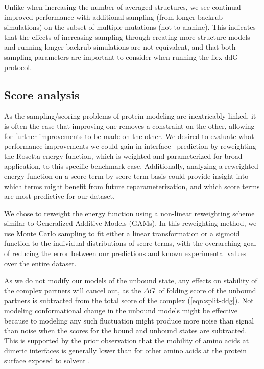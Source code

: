 Unlike when increasing the number of averaged structures, we see continual improved performance with additional sampling (from longer backrub simulations) on the subset of multiple mutations (not to alanine). This indicates that the effects of increasing sampling through creating more structure models and running longer backrub simulations are not equivalent, and that both sampling parameters are important to consider when running the flex ddG protocol.

\subsection{Score analysis}

As the sampling/scoring problems of protein modeling are inextricably linked, it is often the case that improving one removes a constraint on the other, allowing for further improvements to be made on the other.
We desired to evaluate what performance improvements we could gain in interface \ddg\ prediction by reweighting the Rosetta energy function, which is weighted and parameterized for broad application, to this specific benchmark case.
Additionally, analyzing a reweighted energy function on a score term by score term basis could provide insight into which terms might benefit from future reparameterization, and which score terms are most predictive for our dataset.

We chose to reweight the energy function using a non-linear reweighting scheme similar to Generalized Additive Models (GAMs)\cite{wood_fast_2011}.
In this reweighting method, we use Monte Carlo sampling to fit either a linear transformation or a sigmoid function to the individual distributions of score terms, with the overarching goal of reducing the error between our predictions and known experimental values over the entire dataset.

As we do not modify our models of the unbound state, any effects on stability of the complex partners will cancel out, as the $\Delta G$\ of folding score of the unbound partners is subtracted from the total score of the complex (\ref{eqn:split-ddg}).
Not modeling conformational change in the unbound models might be effective because to modeling any such fluctuation might produce more noise than signal than noise when the scores for the bound and unbound states are subtracted.
This is supported by the prior observation that the mobility of amino acids at dimeric interfaces is generally lower than for other amino acids at the protein surface exposed to solvent \cite{zen_comparing_2010}.

